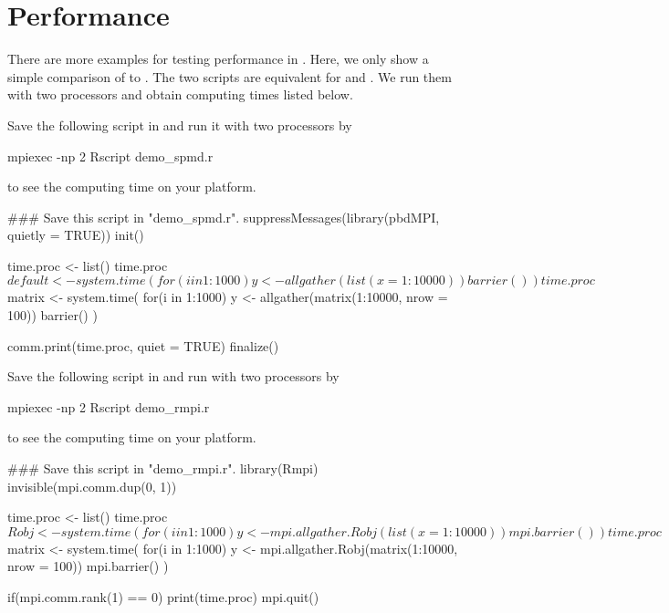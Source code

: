 
\section[Performance]{Performance}
\label{sec:performance}

There are more examples for testing performance in
. Here, we only show a simple
comparison of  to .  The two scripts are
equivalent for  and .  We run them with two
processors and obtain computing times listed below.

Save the following script in  and run it with two
processors by
\begin{Command}
mpiexec -np 2 Rscript demo_spmd.r
\end{Command}
to see the computing time on your platform.

\begin{Code}[title=\pkg{pbdMPI} R Script]
### Save this script in "demo_spmd.r".
suppressMessages(library(pbdMPI, quietly = TRUE))
init()

time.proc <- list()
time.proc$default <- system.time({
  for(i in 1:1000) y <- allgather(list(x = 1:10000))
  barrier()
})

time.proc$matrix <- system.time({
  for(i in 1:1000) y <- allgather(matrix(1:10000, nrow = 100))
  barrier()
})

comm.print(time.proc, quiet = TRUE)
finalize()
\end{Code}

Save the following script in  and run with two processors by
\begin{Command}
mpiexec -np 2 Rscript demo_rmpi.r
\end{Command}
to see the computing time on your platform.

\begin{Code}[title=\pkg{Rmpi} R Script]
### Save this script in "demo_rmpi.r".
library(Rmpi)
invisible(mpi.comm.dup(0, 1))

time.proc <- list()
time.proc$Robj <- system.time({
  for(i in 1:1000) y <- mpi.allgather.Robj(list(x = 1:10000))
  mpi.barrier()
})

time.proc$matrix <- system.time({
  for(i in 1:1000) y <- mpi.allgather.Robj(matrix(1:10000, nrow = 100))
  mpi.barrier()
})

if(mpi.comm.rank(1) == 0) print(time.proc)
mpi.quit()
\end{Code}

